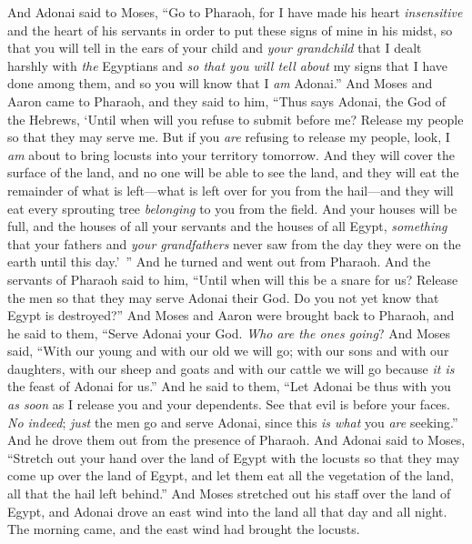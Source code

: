 \begin{biblechapter} %
 And Adonai said to Moses, “Go to Pharaoh, for I have made his heart \textit{insensitive} and the heart of his servants in order to put these signs of mine in his midst,
\verse so that you will tell in the ears of your child and \textit{your grandchild} that I dealt harshly with \textit{the} Egyptians and \textit{so that you will tell about} my signs that I have done among them, and so you will know that I \textit{am} Adonai.”
\verse And Moses and Aaron came to Pharaoh, and they said to him, “Thus says Adonai, the God of the Hebrews, ‘Until when will you refuse to submit before me? Release my people so that they may serve me.
\verse But if you \textit{are} refusing to release my people, look, I \textit{am} about to bring locusts into your territory tomorrow.
\verse And they will cover the surface of the land, and no one will be able to see the land, and they will eat the remainder of what is left—what is left over for you from the hail—and they will eat every sprouting tree \textit{belonging} to you from the field.
\verse And your houses will be full, and the houses of all your servants and the houses of all Egypt, \textit{something} that your fathers and \textit{your grandfathers} never saw from the day they were on the earth until this day.’ ” And he turned and went out from Pharaoh.
\verse And the servants of Pharaoh said to him, “Until when will this be a snare for us? Release the men so that they may serve Adonai their God. Do you not yet know that Egypt is destroyed?”
\verse And Moses and Aaron were brought back to Pharaoh, and he said to them, “Serve Adonai your God. \textit{Who are the ones going}?
\verse And Moses said, “With our young and with our old we will go; with our sons and with our daughters, with our sheep and goats and with our cattle we will go because \textit{it is} the feast of Adonai for us.”
\verse And he said to them, “Let Adonai be thus with you \textit{as soon} as I release you and your dependents. See that evil is before your faces.
\verse \textit{No indeed}; \textit{just} the men go and serve Adonai, since this \textit{is what} you \textit{are} seeking.” And he drove them out from the presence of Pharaoh.
\verse And Adonai said to Moses, “Stretch out your hand over the land of Egypt with the locusts so that they may come up over the land of Egypt, and let them eat all the vegetation of the land, all that the hail left behind.”
\verse And Moses stretched out his staff over the land of Egypt, and Adonai drove an east wind into the land all that day and all night. The morning came, and the east wind had brought the locusts.

\end{biblechapter}
